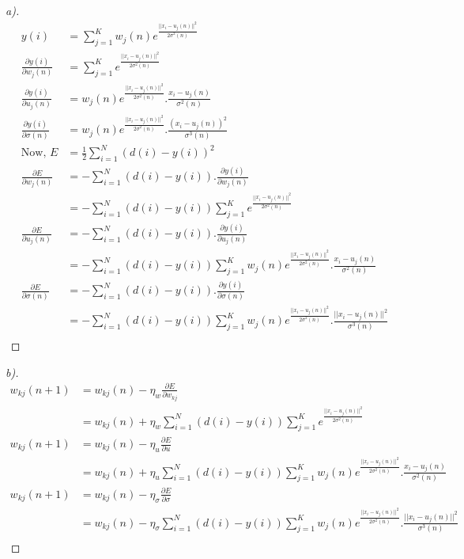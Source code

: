 \documentclass[12pt]{article}
\newenvironment{theorem}[2][Theorem]{\begin{trivlist}
\item[\hskip \labelsep {\bfseries #1}\hskip \labelsep {\bfseries #2.}]}{\end{trivlist}}
\begin{document}
\begin{theorem}[Ans]{3}
\begin{proof}[a)]
\begin{align*}
    y(i) &= \sum_{j=1}^{K} w_{j}(n)e^{\frac{||x_{i} - u_{j}(n)||^{2}}{2\sigma^{2}(n)}}\\
    \frac{\partial y(i)}{\partial w_{j}(n)} &= \sum_{j=1}^{K}e^{\frac{||x_{i} - u_{j}(n)||^{2}}{2\sigma^{2}(n)}}\\
    \frac{\partial y(i)}{\partial u_{j}(n)} &= w_{j}(n)e^{\frac{||x_{i} - u_{j}(n)||^{2}}{2\sigma^{2}(n)}}.\frac{x_{i} - u_{j}(n)}{\sigma^{2}(n)}\\
    \frac{\partial y(i)}{\partial \sigma(n)} &= w_{j}(n)e^{\frac{||x_{i} - u_{j}(n)||^{2}}{2\sigma^{2}(n)}}.\frac{(x_{i} - u_{j}(n))^{2}}{\sigma^{3}(n)}\\
    \text{Now, } E &= \frac{1}{2}  \sum_{i=1}^{N}(d(i)-y(i))^{2}\\
    \frac{\partial E}{\partial w_{j}(n)} &= - \sum_{i=1}^{N}(d(i)-y(i)).\frac{\partial y(i)}{\partial w_{j}(n)}\\
    &= - \sum_{i=1}^{N}(d(i)-y(i))\sum_{j=1}^{K}e^{\frac{||x_{i} - u_{j}(n)||^{2}}{2\sigma^{2}(n)}}\\
    \frac{\partial E}{\partial u_{j}(n)} &= - \sum_{i=1}^{N}(d(i)-y(i)).\frac{\partial y(i)}{\partial u_{j}(n)}\\
    &= - \sum_{i=1}^{N}(d(i)-y(i))\sum_{j=1}^{K}w_{j}(n)e^{\frac{||x_{i} - u_{j}(n)||^{2}}{2\sigma^{2}(n)}}.\frac{x_{i} - u_{j}(n)}{\sigma^{2}(n)}\\
    \frac{\partial E}{\partial \sigma(n)} &= - \sum_{i=1}^{N}(d(i)-y(i)).\frac{\partial y(i)}{\partial \sigma(n)}\\
    &= - \sum_{i=1}^{N}(d(i)-y(i))\sum_{j=1}^{K}w_{j}(n)e^{\frac{||x_{i} - u_{j}(n)||^{2}}{2\sigma^{2}(n)}}.\frac{||x_{i} - u_{j}(n)||^{2}}{\sigma^{3}(n)}\\
\end{align*}
\end{proof}
\begin{proof}[b)]
\begin{align*}
    w_{kj}(n+1) &= w_{kj}(n) - \eta_{w}\frac{\partial E}{\partial w_{kj}}\\
    &= w_{kj}(n) + \eta_{w} \sum_{i=1}^{N}(d(i)-y(i))\sum_{j=1}^{K}e^{\frac{||x_{i} - u_{j}(n)||^{2}}{2\sigma^{2}(n)}}\\
    w_{kj}(n+1) &= w_{kj}(n) - \eta_{u}\frac{\partial E}{\partial u}\\
    &= w_{kj}(n) + \eta_{u}\sum_{i=1}^{N}(d(i)-y(i))\sum_{j=1}^{K}w_{j}(n)e^{\frac{||x_{i} - u_{j}(n)||^{2}}{2\sigma^{2}(n)}}.\frac{x_{i} - u_{j}(n)}{\sigma^{2}(n)}\\
    w_{kj}(n+1) &= w_{kj}(n) - \eta_{\sigma}\frac{\partial E}{\partial \sigma}\\
    &= w_{kj}(n) - \eta_{\sigma}\sum_{i=1}^{N}(d(i)-y(i))\sum_{j=1}^{K}w_{j}(n)e^{\frac{||x_{i} - u_{j}(n)||^{2}}{2\sigma^{2}(n)}}.\frac{||x_{i} - u_{j}(n)||^{2}}{\sigma^{3}(n)}\\
\end{align*}
\end{proof}
\end{theorem}
\end{document}
